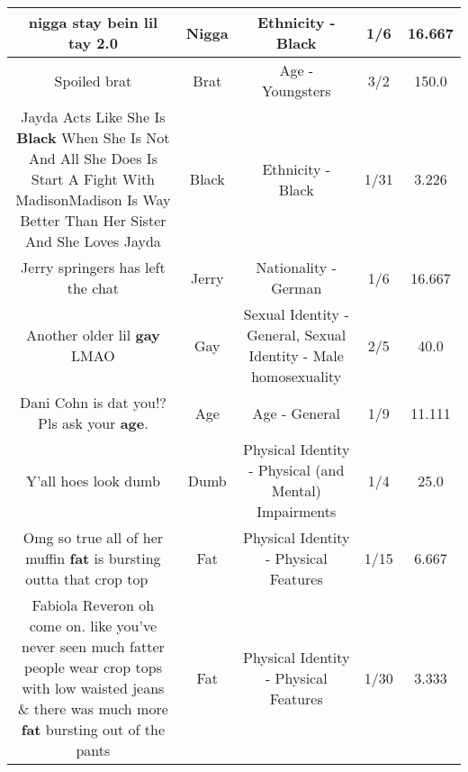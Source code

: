 \documentclass[11pt]{article}
\newlength\mylength
\begin{document}
\begin{center}
\begin{longtable}{|C{.65\mylength}|C{.30\mylength}|C{.12\mylength}|C{.12\mylength}|C{.12\mylength}|}
  \small nigga stay bein lil tay 2.0\normalsize   & Nigga & Ethnicity - Black & 1/6 & 16.667 \\  \hline
  \small Spoiled brat\normalsize   & Brat & Age - Youngsters & 3/2 & 150.0 \\  \hline
  \small Jayda Acts Like She Is \textbf{Black} When She Is Not And All She Does Is Start A Fight With MadisonMadison Is Way Better Than Her Sister And She Loves Jayda\normalsize   & Black & Ethnicity - Black & 1/31 & 3.226 \\  \hline
  \small Jerry springers has left the chat\normalsize   & Jerry & Nationality - German & 1/6 & 16.667 \\  \hline
  \small Another older lil \textbf{g\textbf{ay}} LMAO\normalsize   & Gay & Sexual Identity - General, Sexual Identity - Male homosexuality & 2/5 & 40.0 \\  \hline
  \small Dani Cohn is dat you!? Pls ask your \textbf{age}.\normalsize   & Age & Age - General & 1/9 & 11.111 \\  \hline
  \small Y'all hoes look dumb\normalsize   & Dumb & Physical Identity - Physical (and Mental) Impairments & 1/4 & 25.0 \\  \hline
  \small Omg so true all of her muffin \textbf{fat} is bursting outta that crop top 🤣🤣\normalsize   & Fat & Physical Identity - Physical Features & 1/15 & 6.667 \\  \hline
  \small Fabiola Reveron oh come on. like you've never seen much fatter people wear crop tops with low waisted jeans \& there was much more \textbf{fat} bursting out of the pants\normalsize   & Fat & Physical Identity - Physical Features & 1/30 & 3.333 \\  \hline

\end{longtable}
\end{center}
\end{document}
